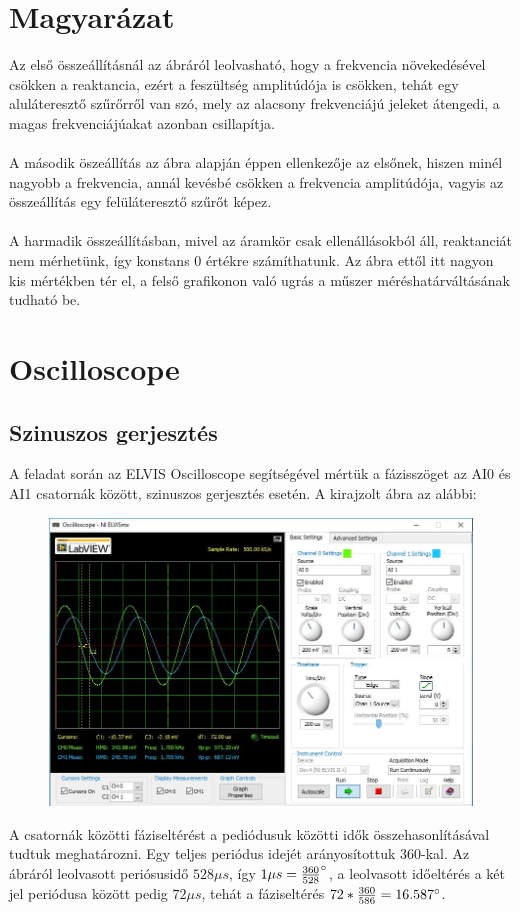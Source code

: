 \documentclass[10pt, conference,a4paper]{ITKproc}
\begin{document}
\section{Magyarázat}
Az első összeállításnál az ábráról leolvasható, hogy a frekvencia növekedésével csökken a reaktancia, 	ezért a feszültség amplitúdója is csökken, tehát egy aluláteresztő szűrőrről van szó, mely az alacsony frekvenciájú jeleket átengedi, a magas frekvenciájúakat azonban csillapítja. 
\\
\\
A második öszeállítás az ábra alapján éppen ellenkezője az elsőnek, hiszen minél nagyobb a frekvencia, annál kevésbé csökken a frekvencia amplitúdója, vagyis az összeállítás egy felüláteresztő szűrőt képez. 
\\
\\
A harmadik összeállításban, mivel az áramkör csak ellenállásokból áll, reaktanciát nem mérhetünk, így konstans 0 értékre számíthatunk. Az ábra ettől itt nagyon kis mértékben tér el, a felső grafikonon való ugrás a műszer méréshatárváltásának tudható be. 

\section{Oscilloscope}
\subsection{Szinuszos gerjesztés}
A feladat során az ELVIS Oscilloscope segítségével mértük a fázisszöget az AI0 és AI1 csatornák között, szinuszos gerjesztés esetén. 
A kirajzolt ábra az alábbi:
\begin{figure}[h]
\includegraphics[scale=0.3]{oscil_1}
\centering
\end{figure}
A csatornák közötti fáziseltérést a pediódusuk közötti idők összehasonlításával tudtuk meghatározni. Egy teljes periódus idejét arányosítottuk 360\degree -kal. Az ábráról leolvasott periósusidő $528\mu s$, így $1\mu s = \frac{360}{528} \degree$, a leolvasott időeltérés a két jel periódusa között pedig $72\mu s$, tehát a fáziseltérés $72*\frac{360}{586} = 16.587 \degree$. 
\end{document}
